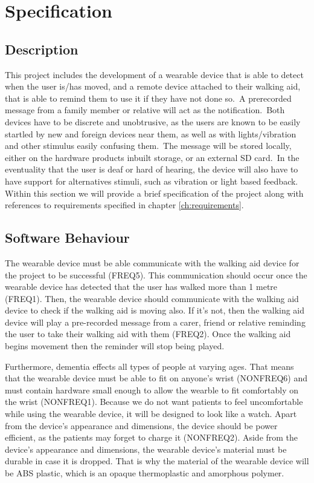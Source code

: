 \chapter{Specification}\label{ch:specification}
    \section{Description}

        This project includes the development of a wearable device that is able to detect when the user is/has moved,
        and a remote device attached to their walking aid, that is able to remind them to use it if they have not done
        so.\ A prerecorded message from a family member or relative will act as the notification.\ Both devices have to
        be discrete and unobtrusive, as the users are known to be easily startled by new and foreign devices near them,
        as well as with lights/vibration and other stimulus easily confusing them.\ The message will be stored locally,
        either on the hardware products inbuilt storage, or an external SD card.\ In the eventuality that the user is
        deaf or hard of hearing, the device will also have to have support for alternatives stimuli, such as vibration
        or light based feedback. Within this section we will provide a brief specification of the project along with references to requirements specified in chapter \ref{ch:requirements}.

    \section{Software Behaviour}

        The wearable device must be able communicate with the walking aid device for the project to be successful (FREQ5). This communication should occur once the wearable device has detected that the user has walked more than 1 metre (FREQ1). Then, the wearable device should communicate with the walking aid device to check if the walking aid is moving also. If it's not, then the walking aid device will play a pre-recorded message from a carer, friend or relative reminding the user to take their walking aid with them (FREQ2). Once the walking aid begins movement then the reminder will stop being played.

        Furthermore, dementia effects all types of people at varying ages. That means that the wearable device must be able to
        fit on anyone's wrist (NONFREQ6) and must contain hardware small enough to allow the wearble to fit comfortably on the wrist (NONFREQ1). Because we do not want patients to feel uncomfortable while using the wearable device, it
        will be designed to look like a watch. Apart from the device's appearance and dimensions, the device should be power efficient, as the
        patients may forget to charge it (NONFREQ2). Aside from the device's appearance and dimensions, the wearable device's material must be durable in  case it is dropped. That is why the material of the wearable device will be ABS plastic, which is an opaque thermoplastic and amorphous polymer.

